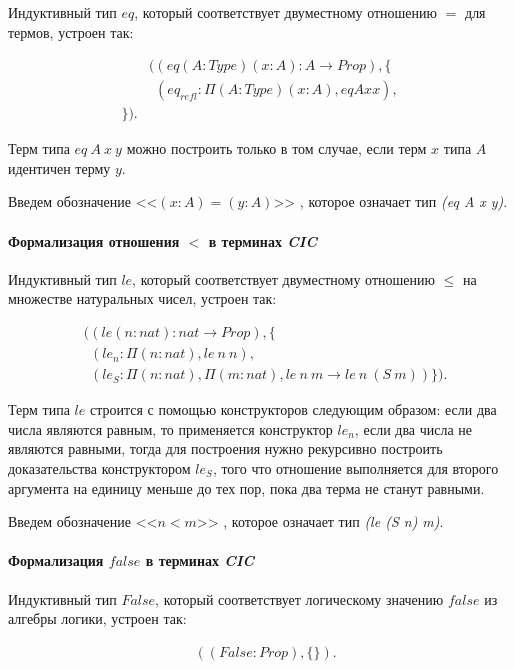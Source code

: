 \documentclass[12pt]{article}
\begin{document}
Индуктивный тип $eq$, который соответствует двуместному отношению $=$ для термов, устроен так:

\begin{align*}
& ((eq (A : Type) (x : A): A \xrightarrow{} Prop), \{ \\ 
& \ \ (eq_{refl} : \Pi(A : Type) (x : A), eq A x x ), \\
 \}).
\end{align*}

Терм типа $eq\ A\ x\ y$ можно построить только в том случае, если терм $x$ типа $A$ идентичен терму $y$.

Введем обозначение  <<$(x:A) = (y:A)$>> , которое означает тип \textit{(eq A x y)}.

\paragraph{Формализация отношения $<$ в терминах \textit{CIC}}\mbox{}

Индуктивный тип $le$, который соответствует двуместному отношению $\leq$ на множестве натуральных чисел, устроен так:

\begin{align*}
& ((le (n : nat): nat \xrightarrow{} Prop), \{ \\ 
& \ \ (le_n : \Pi(n:nat), le\ n\ n ), \\
& \ \ (le_S : \Pi(n:nat), \Pi(m : nat), le\ n\ m \xrightarrow{} le\ n\ (S\ m)) \}).
\end{align*}

Терм типа $le$ строится с помощью конструкторов следующим образом: если два числа являются равным, то применяется конструктор $le_n$, если два числа не являются равными, тогда для построения нужно рекурсивно построить доказательства конструктором $le_S$, того что отношение выполняется для второго аргумента на единицу меньше до тех пор, пока два терма не станут равными.

Введем обозначение  <<$n < m$>> , которое означает тип \textit{(le (S n) m)}.

\paragraph{Формализация $false$ в терминах \textit{CIC}}\mbox{}

Индуктивный тип $False$, который соответствует логическому значению $false$ из алгебры логики, устроен так:

\begin{align*}
& ((False : Prop), \{ \}).
\end{align*}
\end{document}
